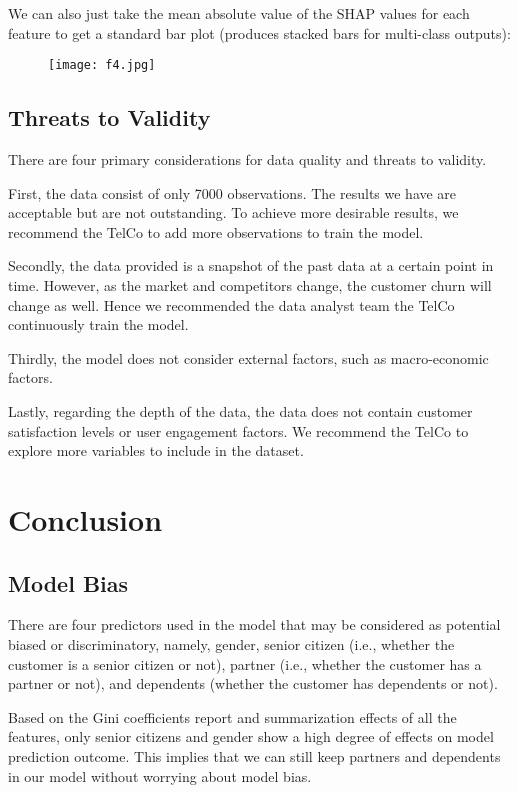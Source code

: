 \documentclass[12pt]{article}
\begin{document}
We can also just take the mean absolute value of the SHAP values for each feature to get a standard bar plot (produces stacked bars for multi-class outputs):
\begin{figure}[htbp]
\centering
\texttt{[image: f4.jpg]}
\caption{}\label{fig:}
\end{figure}

\subsection{Threats to Validity}

There are four primary considerations for data quality and threats to validity. 

First, the data consist of only 7000 observations. The results we have are acceptable but are not outstanding. To achieve more desirable results, we recommend the TelCo to add more observations to train the model. 

Secondly, the data provided is a snapshot of the past data at a certain point in time. However, as the market and competitors change, the customer churn will change as well. Hence we recommended the data analyst team the TelCo continuously train the model. 

Thirdly, the model does not consider external factors, such as macro-economic factors. 

Lastly, regarding the depth of the data, the data does not contain customer satisfaction levels or user engagement factors. We recommend the TelCo to explore more variables to include in the dataset. 

\section{Conclusion} \label{sec:conclusion}
\subsection{Model Bias}

There are four predictors used in the model that may be considered as potential biased or discriminatory, namely, gender, senior citizen (i.e., whether the customer is a senior citizen or not), partner (i.e., whether the customer has a partner or not), and dependents (whether the customer has dependents or not). 

Based on the Gini coefficients report and summarization effects of all the features, only senior citizens and gender show a high degree of effects on model prediction outcome. This implies that we can still keep partners and dependents in our model without worrying about model bias. 
\end{document}
